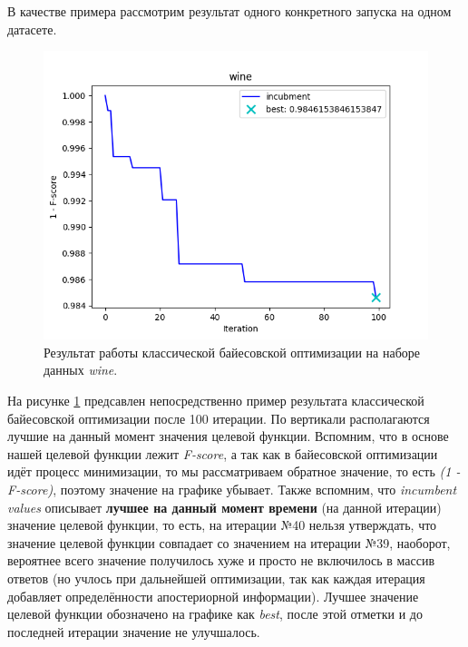 \documentclass[times,specification,annotation]{itmo-student-thesis}
\begin{document}
	В качестве примера рассмотрим результат одного конкретного запуска на одном датасете.
	\begin{figure}[!ht]
		\caption{Результат работы классической байесовской оптимизации на наборе данных \textit{wine}.}\label{img:bo-wine}
		\includegraphics[width=0.85\linewidth]{../png/incubment-iteration/wine}
		\centering
	\end{figure}
	На рисунке \ref{img:bo-wine} предсавлен непосредственно пример результата классической байесовской оптимизации после 100 итерации. По вертикали располагаются лучшие на данный момент значения целевой функции. Вспомним, что в основе нашей целевой функции лежит \textit{F-score}, а так как в байесовской оптимизации идёт процесс минимизации, то мы рассматриваем обратное значение, то есть \textit{(1 - F-score)}, поэтому значение на графике убывает. Также вспомним, что \textit{incumbent values} описывает \textbf{лучшее на данный момент времени} (на данной итерации) значение целевой функции, то есть, на итерации №40 нельзя утверждать, что значение целевой функции совпадает со значением на итерации №39, наоборот, вероятнее всего значение получилось хуже и просто не включилось в массив ответов (но учлось при дальнейшей оптимизации, так как каждая итерация добавляет определённости апостериорной информации). Лучшее значение целевой функции обозначено на графике как \textit{best}, после этой отметки и до последней итерации значение не улучшалось. \par 
	
\end{document}
